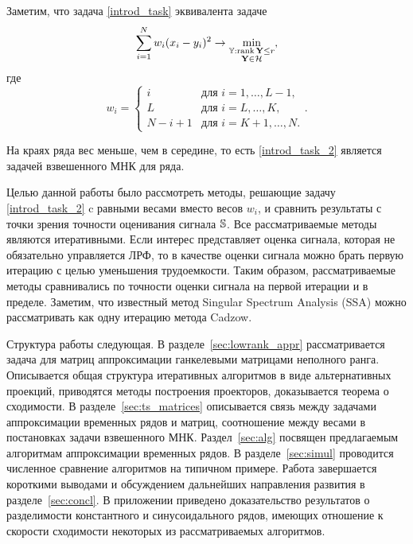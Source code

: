 \documentclass[12pt,a4paper,fleqn,leqno]{article}
\def\rank{\mathop{\mathrm{rank}}}
\begin{document}
Заметим, что задача \eqref{introd_task} эквивалента задаче
\begin{equation}\label{introd_task_2}
\sum_{i = 1}^N w_i(x_i - y_i)^2 \to \min_{\substack{\tsY: \rank \bfY \le r \\ \bfY \in \calH}},
\end{equation}
где
\begin{equation}
\label{eq:w}
w_i = \begin{cases}
i & \text{для $i = 1, \ldots, L-1,$}\\
L & \text{для $i = L, \ldots, K,$}\\
N - i + 1 & \text{для $i = K + 1, \ldots, N.$}
\end{cases}.
\end{equation}

На краях ряда вес меньше, чем в середине, то есть \eqref{introd_task_2} является задачей взвешенного МНК для ряда.

Целью данной работы было рассмотреть методы, решающие задачу \eqref{introd_task_2} c равными весами вместо весов $w_i$, и сравнить результаты с точки зрения точности оценивания сигнала $\mathbb{S}$. Все рассматриваемые методы являются итеративными. Если интерес представляет оценка сигнала, которая не обязательно управляется ЛРФ, то в качестве оценки сигнала можно брать первую итерацию с целью уменьшения трудоемкости. Таким образом, рассматриваемые методы сравнивались по точности оценки сигнала на первой итерации и в пределе. Заметим, что известный метод Singular Spectrum Analysis (SSA) \cite{Broomhead.King1986, Vautard.etal1992, Elsner.Tsonis1996, Golyandina.etal2001, Ghil.etal2002, Golyandina.Zhigljavsky2012} можно
рассматривать как одну итерацию метода Cadzow.

Структура работы следующая.  В разделе~\ref{sec:lowrank_appr} рассматривается задача для матриц аппроксимации ганкелевыми матрицами неполного ранга.
Описывается общая структура итеративных алгоритмов в виде альтернативных проекций, приводятся методы построения проекторов, доказывается теорема о сходимости.
В разделе~\ref{sec:ts_matrices} описывается связь между задачами аппроксимации временных рядов и матриц, соотношение между весами в постановках задачи
взвешенного МНК. Раздел~\ref{sec:alg} посвящен предлагаемым алгоритмам аппроксимации временных рядов. В разделе~\ref{sec:simul} проводится численное сравнение алгоритмов на типичном примере.
Работа завершается короткими выводами и обсуждением дальнейших направления развития в разделе~\ref{sec:concl}. В приложении приведено доказательство результатов
о разделимости константного и синусоидального рядов, имеющих отношение к скорости сходимости некоторых из рассматриваемых алгоритмов.
\end{document}
